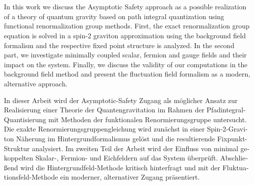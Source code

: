 {\hypersetup{allcolors=black}
\thispagestyle{plain}

\makeatletter

\begin{center}
\textbf{\large\@title} \\
\vspace{.1cm}
\@author \\
\end{center}

\makeatother

In this work we discuss the Asymptotic Safety approach as a possible realization of a theory of quantum gravity based on path integral quantization using functional renormalization group methods. First, the exact renormalization group equation is solved in a spin-2 graviton approximation using the background field formalism and the respective fixed point structure is analyzed. In the second part, we investigate minimally coupled scalar, fermion and gauge fields and their impact on the system. Finally, we discuss the validity of our computations in the background field method and present the fluctuation field formalism as a modern, alternative approach. 

\vfill

\begin{otherlanguage}{german}
In dieser Arbeit wird der Asymptotic-Safety Zugang als m\"oglicher Ansatz zur Realisierung einer Theorie der Quantengravitation im Rahmen der Pfadintegral-Quantisierung mit Methoden der funktionalen Renormierungsgruppe untersucht. Die exakte Renormierungsgruppengleichung wird zun\"achst in einer Spin-2-Graviton N\"aherung im Hintergrundformalismus gel\"ost und die resultierende Fixpunkt-Struktur analysiert. Im zweiten Teil der Arbeit wird der Einfluss von minimal gekoppelten Skalar-, Fermion- und Eichfeldern auf das System \"uberpr\"uft. Abschlie\ss end wird die Hintergrundfeld-Methode kritisch hinterfragt und mit der Fluktuationsfeld-Methode ein moderner, alternativer Zugang pr\"asentiert.
\end{otherlanguage}
\vfill
\cleardoublepage}
